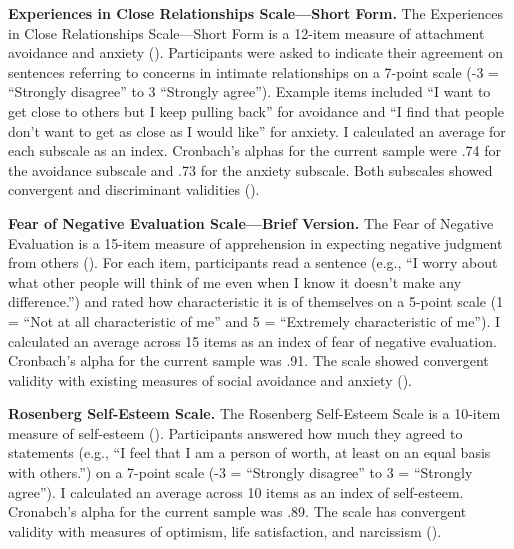 \documentclass[
]{udthesis}
\begin{document}
\textbf{Experiences in Close Relationships Scale---Short Form.} The Experiences in Close Relationships Scale---Short Form is a 12-item measure of attachment avoidance and anxiety (). Participants were asked to indicate their agreement on sentences referring to concerns in intimate relationships on a 7-point scale (-3 = ``Strongly disagree'' to 3 ``Strongly agree''). Example items included ``I want to get close to others but I keep pulling back'' for avoidance and ``I find that people don't want to get as close as I would like'' for anxiety. I calculated an average for each subscale as an index. Cronbach's alphas for the current sample were .74 for the avoidance subscale and .73 for the anxiety subscale. Both subscales showed convergent and discriminant validities ().

\textbf{Fear of Negative Evaluation Scale---Brief Version.} The Fear of Negative Evaluation is a 15-item measure of apprehension in expecting negative judgment from others (). For each item, participants read a sentence (e.g., ``I worry about what other people will think of me even when I know it doesn't make any difference.'') and rated how characteristic it is of themselves on a 5-point scale (1 = ``Not at all characteristic of me'' and 5 = ``Extremely characteristic of me''). I calculated an average across 15 items as an index of fear of negative evaluation. Cronbach's alpha for the current sample was .91. The scale showed convergent validity with existing measures of social avoidance and anxiety ().

\textbf{Rosenberg Self-Esteem Scale.} The Rosenberg Self-Esteem Scale is a 10-item measure of self-esteem (). Participants answered how much they agreed to statements (e.g., ``I feel that I am a person of worth, at least on an equal basis with others.'') on a 7-point scale (-3 = ``Strongly disagree'' to 3 = ``Strongly agree''). I calculated an average across 10 items as an index of self-esteem. Cronabch's alpha for the current sample was .89. The scale has convergent validity with measures of optimism, life satisfaction, and narcissism ().
\end{document}
